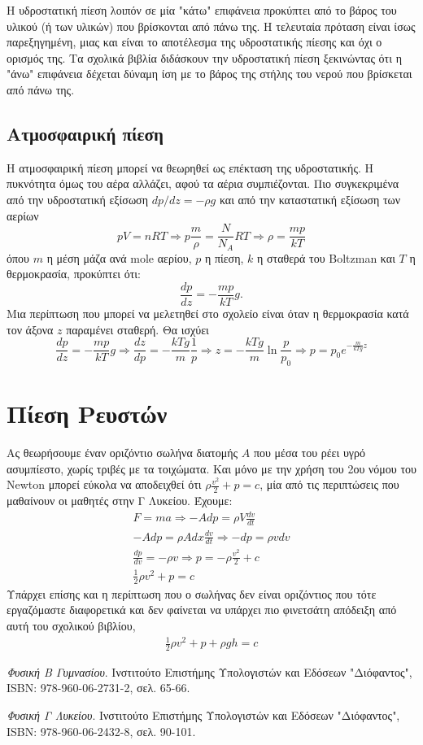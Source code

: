 \documentclass[12pt,titlepage]{article}
\begin{document}
Η υδροστατική πίεση λοιπόν σε μία "κάτω" επιφάνεια προκύπτει από το βάρος του υλικού (ή των υλικών) που βρίσκονται από πάνω της. Η τελευταία πρόταση είναι ίσως παρεξηγημένη, μιας και είναι το αποτέλεσμα της υδροστατικής πίεσης και όχι ο ορισμός της. Τα σχολικά βιβλία διδάσκουν την υδροστατική πίεση ξεκινώντας ότι η "άνω" επιφάνεια δέχεται δύναμη ίση με το βάρος της στήλης του νερού που βρίσκεται από πάνω της.
\subsection{Ατμοσφαιρική πίεση}
Η ατμοσφαιρική πίεση μπορεί να θεωρηθεί ως επέκταση της υδροστατικής. Η πυκνότητα όμως του αέρα αλλάζει, αφού τα αέρια συμπιέζονται. Πιο συγκεκριμένα από την υδροστατική εξίσωση $dp/dz=-ρg$ και από την καταστατική εξίσωση των αερίων
$$pV=nRT \Rightarrow p\frac{m}{ρ}=\frac{N}{N_A}RT \Rightarrow ρ=\frac{mp}{kT}$$
όπου $m$ η μέση μάζα ανά mole αερίου, $p$ η πίεση, $k$ η σταθερά του Boltzman και $T$ η θερμοκρασία, προκύπτει ότι:
\begin{equation*}
 \frac{dp}{dz}=-\frac{mp}{kT}g.
\end{equation*}
Μια περίπτωση που μπορεί να μελετηθεί στο σχολείο είναι όταν η θερμοκρασία κατά τον άξονα $z$ παραμένει σταθερή. Θα ισχύει
\begin{equation} \label{eq:16}
 \frac{dp}{dz}=-\frac{mp}{kT}g \Rightarrow \frac{dz}{dp}=-\frac{kTg}{m}\frac{1}{p} \Rightarrow z=-\frac{kTg}{m}\ln \frac{p}{p_0} \Rightarrow p=p_0e^{-\frac{m}{kTg}z}
\end{equation}

\section{Πίεση Ρευστών}
Ας θεωρήσουμε έναν οριζόντιο σωλήνα διατομής $A$ που μέσα του ρέει υγρό ασυμπίεστο, χωρίς τριβές με τα τοιχώματα. Και μόνο με την χρήση του 2ου νόμου του Newton μπορεί εύκολα να αποδειχθεί ότι $ρ\frac{v^2}{2}+p=c$, μία από τις περιπτώσεις που μαθαίνουν οι μαθητές στην Γ Λυκείου. Έχουμε:
\begin{gather*}
 F=ma \Rightarrow -Adp=ρV\frac{dv}{dt} \\
 -Adp=ρAdx\frac{dv}{dt} \Rightarrow -dp=ρv dv \\
 \frac{dp}{dv}=-ρv \Rightarrow p=-ρ\frac{v^2}{2}+c \\
 \frac{1}{2}ρv^2+p=c
\end{gather*}
Υπάρχει επίσης και η περίπτωση που ο σωλήνας δεν είναι οριζόντιος που τότε εργαζόμαστε διαφορετικά και δεν φαίνεται να υπάρχει πιο φινετσάτη απόδειξη από αυτή του σχολικού βιβλίου,
\begin{gather*}
 \frac{1}{2}ρv^2+p+ρgh=c
\end{gather*}


\begin{thebibliography}{9}
\textit{Φυσική Β Γυμνασίου}.
Ινστιτούτο Επιστήμης Υπολογιστών και Εδόσεων "Διόφαντος", ISBN: 978-960-06-2731-2, σελ. 65-66.

\textit{Φυσική Γ Λυκείου}.
Ινστιτούτο Επιστήμης Υπολογιστών και Εδόσεων "Διόφαντος", ISBN: 978-960-06-2432-8, σελ. 90-101.

\end{thebibliography}
\end{document}

